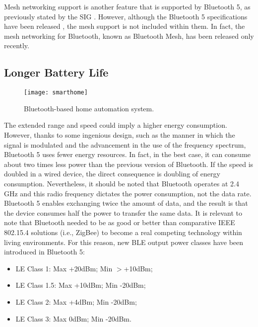 \documentclass[12pt, draftclsnofoot, onecolumn]{IEEEtran}
\begin{document}
Mesh networking support is another feature that is supported by Bluetooth 5, as previously stated by the SIG \cite{mesh}. However, although the Bluetooth 5 specifications have been released \cite{bt5release}, the mesh support is not included within them. In fact, the mesh networking for Bluetooth, known as Bluetooth Mesh, has been released only recently. 

\subsection{Longer Battery Life}
\label{subsec:battery}

\begin{figure}
\centering
\texttt{[image: smarthome]}
\caption{Bluetooth-based home automation system.}
\label{fig:smarthome}
\end{figure}

The extended range and speed could imply a higher energy consumption. However, thanks to some ingenious design, such as the manner in which the signal is modulated and the advancement in the use of the frequency spectrum, Bluetooth 5 uses fewer energy resources. In fact, in the best case, it can consume about two times less power than the previous version of Bluetooth. If the speed is doubled in a wired device, the direct consequence is doubling of energy consumption. Nevertheless, it should be noted that Bluetooth operates at 2.4 GHz and this radio frequency dictates the power consumption, not the data rate. Bluetooth 5 enables exchanging twice the amount of data, and the result is that the device consumes half the power to transfer the same data. %
It is relevant to note that Bluetooth needed to be as good or better than comparative IEEE 802.15.4 solutions (i.e., ZigBee) to become a real competing technology within living environments. For this reason, new BLE output power classes have been introduced in Bluetooth 5:
	\begin{itemize}
	\item LE Class 1: Max +20dBm; Min $>$+10dBm;
	\item LE Class 1.5: Max +10dBm; Min -20dBm;
	\item LE Class 2: Max +4dBm; Min -20dBm;
	\item LE Class 3: Max 0dBm; Min -20dBm.
\end{itemize}
\end{document}
